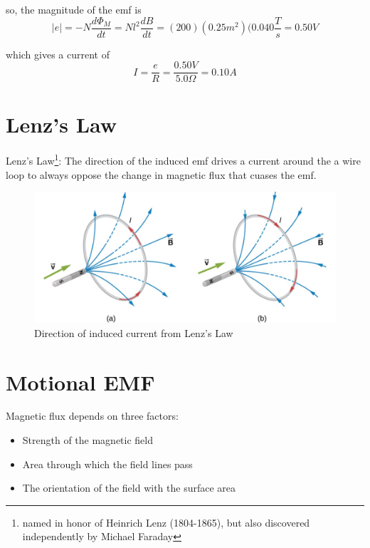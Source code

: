 \documentclass[14pt]{memoir}
\begin{document}
so, the magnitude of the emf is
\begin{equation}
|e| = -N\frac{d\Phi_M}{dt} = N l^2 \frac{dB}{dt} = (200)(0.25m^2)(0.040\frac{T}{s} = 0.50V
\end{equation}

which gives a current of
\begin{equation}
I = \frac{e}{R} = \frac{0.50V}{5.0 \Omega} = 0.10 A
\end{equation}

\section{Lenz's Law}

Lenz's Law\footnote{named in honor of Heinrich Lenz (1804-1865), but also discovered independently by Michael Faraday}: The direction of the induced emf drives a current around the a wire loop to always oppose the change in magnetic flux that cuases the emf. 


\begin{figure}[H]
\begin{center}
\includegraphics[scale=0.5]{fig/fig_13_07.jpg}
\caption{Direction of induced current from Lenz's Law}
\label{fig:13_07}
\end{center}
\end{figure}

\section{Motional EMF}

Magnetic flux depends on three factors:
\begin{itemize}
\item Strength of the magnetic field
\item Area through which the field lines pass
\item The orientation of the field with the surface area
\end{itemize}
\end{document}
